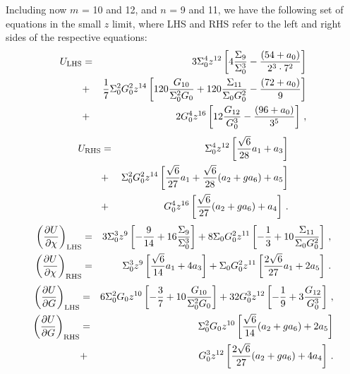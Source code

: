 \documentclass[aps,prd,12pt,nofootinbib]{revtex4}
\newcommand{\ba}{\begin{eqnarray}}
\newcommand{\ea}{\end{eqnarray}}
\def\rt6{\sqrt{6}}
\begin{document}
Including now $m$ = 10 and 12, and $n$ = 9 and 11, we have the following set of equations in the small $z$ limit, where LHS and RHS refer to the left and right sides of the respective equations:
\ba
U_{\rm LHS} &=& 3 \Sigma_0^4 z^{12} \left[ 4 \frac{\Sigma_9}{\Sigma_0^3} - \frac{(54+a_0)}{2^3 \cdot 7^2} \right] \nonumber \\
&+& \frac{1}{7} \Sigma_0^2 G_0^2 z^{14} \left[ 120 \frac{G_{10}}{\Sigma_0^2 G_0} + 120 \frac{\Sigma_{11}}{\Sigma_0 G_0^2} - \frac{(72+a_0)}{9} \right] \nonumber \\
&+& 2G_0^4 z^{16} \left[ 12 \frac{G_{12}}{G_0^3} - \frac{(96+a_0)}{3^5} \right] \, ,
\ea
\ba
U_{\rm RHS} &=& \Sigma_0^4 z^{12} \left[  \frac{\rt6}{28} a_1 + a_3\right] \nonumber \\
&+& \Sigma_0^2 G_0^2 z^{14} \left[ \frac{\rt6}{27} a_1 + \frac{\rt6}{28} (a_2 + g a_6) + a_5 \right] \nonumber \\
&+& G_0^4 z^{16} \left[ \frac{\rt6}{27} (a_2 + g a_6) + a_4 \right] \, .
\ea
\ba
\left(\frac{\partial U}{\partial \chi}\right)_{\rm LHS} &=& 3 \Sigma_0^3 z^9 \left[ -\frac{9}{14} + 16 \frac{\Sigma_9}{\Sigma_0^3} \right]+ 8 \Sigma_0 G_0^2 z^{11} \left[ - \frac{1}{3} + 10 \frac{\Sigma_{11}}{\Sigma_0 G_0^2} \right] \, , \\
\left(\frac{\partial U}{\partial \chi}\right)_{\rm RHS} &=& \Sigma_0^3 z^9 \left[ \frac{\rt6}{14} a_1 + 4 a_3  \right]+ \Sigma_0 G_0^2 z^{11} \left[  \frac{2\rt6}{27} a_1 + 2 a_5 \right] \, .
\ea
\ba
\left(\frac{\partial U}{\partial G}\right)_{\rm LHS} &=& 6 \Sigma_0^2 G_0 z^{10} \left[ -\frac{3}{7} + 10 \frac{G_{10}}{\Sigma_0^2 G_0} \right]
+ 32 G_0^3 z^{12} \left[ - \frac{1}{9} + 3 \frac{G_{12}}{G_0^3} \right] \, , \\
\left(\frac{\partial U}{\partial G}\right)_{\rm RHS} &=& \Sigma_0^2 G_0 z^{10} \left[ \frac{\rt6}{14} (a_2 + g a_6) + 2a_5 \right] \\
&+& G_0^3 z^{12} \left[ \frac{2\rt6}{27}  (a_2 + g a_6) + 4a_4 \right] \, .
\ea
\end{document}
